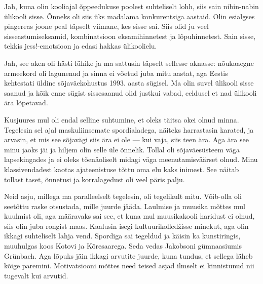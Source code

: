 
Jah, kuna olin kooliajal õppeedukuse
poolest suhteliselt lohh, siis sain nibin-nabin ülikooli sisse. 
Õnneks oli siis üks madalama konkurentsiga aastaid. Olin esialgses pingereas joone peal täpselt viimane, kes sisse sai. 
Siis olid ju veel sisseastumiseksamid, kombinatsioon 
eksamihinnetest ja lõpuhinnetest. Sain sisse, tekkis jess!-emotsioon ja edasi hakkas ülikoolielu. 


Jah, see aken oli hästi lühike ja ma sattusin täpselt sellesse aknasse: 
nõukaaegne armeekord oli 
lagunenud ja sinna ei võetud juba mitu aastat, aga Eestis kehtestati üldine 
sõjaväekohustus 1993. aasta sügisel. Ma olin suvel ülikooli sisse 
saanud ja kõik enne sügist sissesaanud olid justkui vabad, eeldusel et nad ülikooli ära lõpetavad. 


Kusjuures mul oli endal selline suhtumine, et 
oleks täitsa okei olnud minna. Tegelesin sel ajal maskuliinsemate spordialadega, näiteks harrastasin karated, ja 
arvasin, et mis see sõjavägi siis ära ei ole --- kui vaja, siis 
teen ära. Aga ära see minu jaoks jäi ja hiljem olin selle üle õnnelik. 
Tollal oli sõjaväesüsteem 
väga lapsekingades ja ei oleks tõenäoliselt midagi 
väga meenutamisväärset olnud. Minu 
klassivendadest kaotas ajateenistuse tõttu oma elu kaks inimest. See 
näitab tollast taset, õnnetusi ja korralagedust oli veel päris palju. 


Neid asju, millega ma paralleelselt tegelesin, oli tegelikult mitu. Võib-olla oli seetõttu raske otsustada, mille juurde jääda. 
Laulmise ja muusika mõttes mul kuulmist oli, aga määravaks sai see, et 
kuna mul muusikakooli haridust ei olnud, siis olin juba 
rongist maas. Kaalusin isegi 
kultuurikolledžisse minekut, aga olin ikkagi suhteliselt lahja 
vend. Spordiga sai tegeldud ja käisin ka kunstiringis, muuhulgas koos 
Kotovi ja Kõresaarega. Seda vedas Jakobsoni gümnaasiumis Grünbach. Aga
lõpuks jäin ikkagi arvutite juurde, kuna tundus, et sellega läheb kõige paremini. Motivatsiooni mõttes need teised asjad 
ilmselt ei kinnistunud nii tugevalt kui arvutid. 

